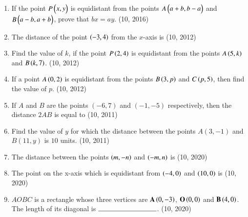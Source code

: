 \begin{enumerate}[label=\thesubsection.\arabic*, ref=\thesubsection.\theenumi]
    \item If the point $P \begin{pmatrix}x, y\end{pmatrix}$ is equidistant from the points $A \begin{pmatrix}a+b, b-a\end{pmatrix}$ and $B \begin{pmatrix}a-b, a+b\end{pmatrix}$, prove that $bx = ay$. \hfill (10, 2016)
\item The distance of the point $\left(-3,4\right)$ from the $x$-axis is
\hfill (10, 2012)
\item Find the value of $k$, if the point $P\left(2,4\right)$ is equidistant from the points $A\left(5,k\right)$ and $B\left(k,7\right)$. 
\hfill (10, 2012)
\item If a point $A\left(0,2\right)$ is equidistant from the points $B\left(3,p\right)$ and $C\left(p,5\right)$, then find the value of $p$. 
\hfill (10, 2012)
\item If $A$ and $B$ are the points $(-6, 7)$ and $(-1, -5)$ respectively, then the distance $2AB$ is equal to
\hfill (10, 2011)
\item Find the value of $y$ for which the distance between the points $A(3, -1)$ and $B(11, y)$ is $10$ units.
\hfill (10, 2011)
\item The distance between the points $\left(m,-n\right)$ and $\left(-m, n\right)$ is
\hfill (10, 2020)
\item The point on the x-axis which is equidistant from $\left(-4,0\right)$ and $\left(10,0\right)$ is
\hfill (10, 2020)
\item $AOBC$ is a rectangle whose three vertices are $\mathbf{A}\left(0,-3\right)$, $\mathbf{O}\left(0,0\right)$ and $\mathbf{B}\left(4,0\right)$. The length of its diagonal is $\rule{3cm}{0.15mm}$.
\hfill (10, 2020)
\end{enumerate}
